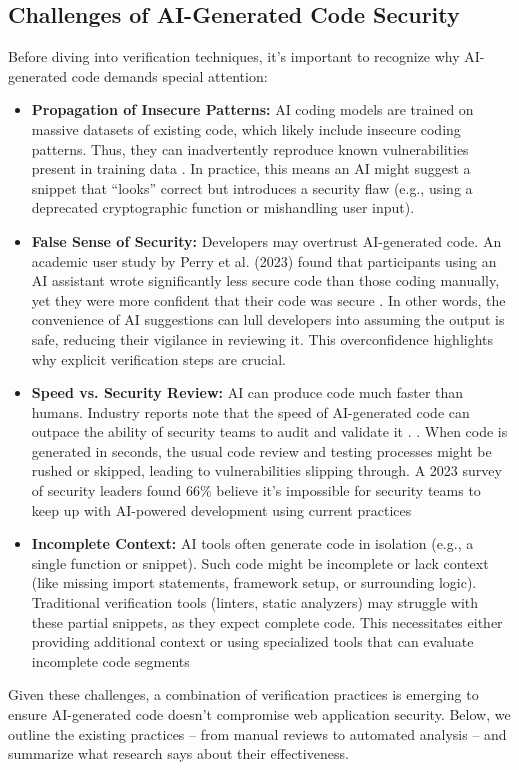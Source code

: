 \subsection{Challenges of AI-Generated Code Security}
Before diving into verification techniques, it’s important to recognize why AI-generated code demands special attention:
\begin{itemize}
    \item \textbf{Propagation of Insecure Patterns:} AI coding models are trained on massive datasets of existing code, which likely include insecure coding patterns. Thus, they can inadvertently reproduce known vulnerabilities present in training data \cite{fu2025security}. In practice, this means an AI might suggest a snippet that “looks” correct but introduces a security flaw (e.g., using a deprecated cryptographic function or mishandling user input).
    \item \textbf{False Sense of Security:} Developers may overtrust AI-generated code. An academic user study by Perry et al. (2023) found that participants using an AI assistant wrote significantly less secure code than those coding manually, yet they were more confident that their code was secure \cite{perry2023}. In other words, the convenience of AI suggestions can lull developers into assuming the output is safe, reducing their vigilance in reviewing it. This overconfidence highlights why explicit verification steps are crucial.
    \item \textbf{Speed vs. Security Review:} AI can produce code much faster than humans. Industry reports note that the speed of AI-generated code can outpace the ability of security teams to audit and validate it \cite{scworld2024ai}. . When code is generated in seconds, the usual code review and testing processes might be rushed or skipped, leading to vulnerabilities slipping through. A 2023 survey of security leaders found 66\% believe it’s impossible for security teams to keep up with AI-powered development using current practices \cite{cyberark2024press}
    \item \textbf{Incomplete Context:} AI tools often generate code in isolation (e.g., a single function or snippet). Such code might be incomplete or lack context (like missing import statements, framework setup, or surrounding logic). Traditional verification tools (linters, static analyzers) may struggle with these partial snippets, as they expect complete code. This necessitates either providing additional context or using specialized tools that can evaluate incomplete code segments \cite{deluca2024devaic}
\end{itemize}
Given these challenges, a combination of verification practices is emerging to ensure AI-generated code doesn’t compromise web application security. Below, we outline the existing practices – from manual reviews to automated analysis – and summarize what research says about their effectiveness.


